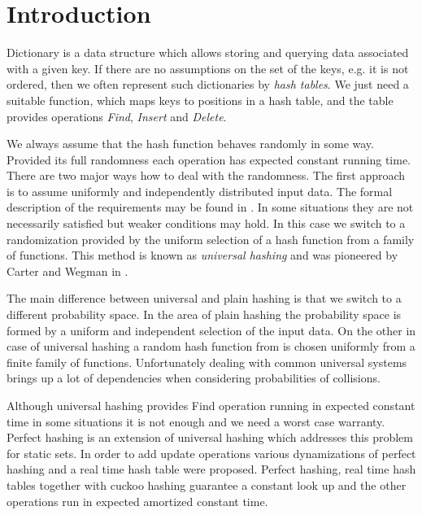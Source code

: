 \section{Introduction}
Dictionary is a data structure which allows storing and querying data associated with a given key. If there are no assumptions on the set of the keys, e.g. it is not ordered, then we often represent such dictionaries by \emph{hash tables}. We just need a suitable function, which maps keys to positions in a hash table, and the table provides operations \emph{Find}, \emph{Insert} and \emph{Delete}. 

We always assume that the hash function behaves randomly in some way. Provided its full randomness each operation has expected constant running time. There are two major ways how to deal with the randomness. The first approach is to assume uniformly and independently distributed input data. The formal description of the requirements may be found in \cite{DBLP:books/sp/Mehlhorn84}. In some situations they are not necessarily satisfied but weaker conditions may hold. In this case we switch to a randomization provided by the uniform selection of a hash function from a family of functions. This method is known as \emph{universal hashing} and was pioneered by Carter and Wegman in \cite{DBLP:journals/jcss/CarterW79}. 

The main difference between universal and plain hashing is that we switch to a different probability space. In the area of plain hashing the probability space is formed by a uniform and independent selection of the input data. On the other in case of universal hashing a random hash function from is chosen uniformly from a finite family of functions. Unfortunately dealing with common universal systems brings up a lot of dependencies when considering probabilities of collisions.

Although universal hashing provides Find operation running in expected constant time in some situations it is not enough and we need a worst case warranty. Perfect hashing \cite{Fredman:1984:SST:828.1884} is an extension of universal hashing which addresses this problem for static sets. In order to add update operations various dynamizations of perfect hashing \cite{DBLP:journals/siamcomp/DietzfelbingerKMHRT94} and a real time hash table \cite{DBLP:conf/icalp/DietzfelbingerH90} were proposed. Perfect hashing, real time hash tables together with cuckoo hashing \cite{DBLP:conf/esa/PaghR01} guarantee a constant look up and the other operations run in expected amortized constant time.

